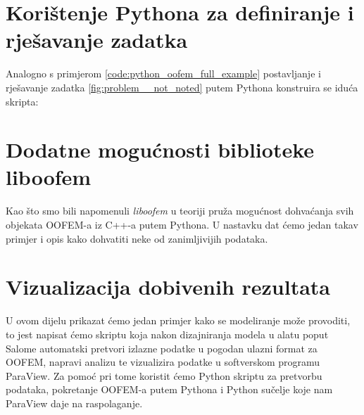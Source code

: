 \documentclass[a4paper,twoside,12pt]{memoir} %
\begin{document}


\section{Korištenje Pythona za definiranje i rješavanje zadatka}
Analogno s primjerom \ref{code:python_oofem_full_example} postavljanje i rješavanje zadatka \ref{fig:problem__not_noted} putem Pythona konstruira se iduća skripta:




\section{Dodatne mogućnosti biblioteke liboofem}
Kao što smo bili napomenuli \textit{liboofem} u teoriji pruža mogućnost dohvaćanja svih objekata OOFEM-a iz C++-a putem Pythona. U nastavku dat ćemo jedan takav primjer i opis kako dohvatiti neke od zanimljivijih podataka.




\section{Vizualizacija dobivenih rezultata}
U ovom dijelu prikazat ćemo jedan primjer kako se modeliranje može provoditi, to jest napisat ćemo skriptu koja nakon dizajniranja modela u alatu poput Salome automatski pretvori izlazne podatke u pogodan ulazni format za OOFEM, napravi analizu te vizualizira podatke u softverskom programu ParaView. Za pomoć pri tome koristit ćemo Python skriptu za pretvorbu podataka, pokretanje OOFEM-a putem Pythona i Python sučelje koje nam ParaView daje na raspolaganje.


\end{document}
